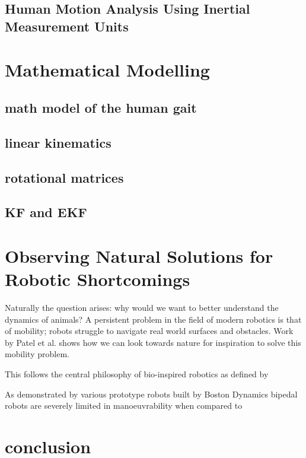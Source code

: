 \subsection{}
\subsection{Human Motion Analysis Using Inertial Measurement Units}


\section{Mathematical Modelling}
\subsection{math model of the human gait}
\subsection{linear kinematics}
\subsection{rotational matrices}
\subsection{KF and EKF}


\section{Observing Natural Solutions for Robotic Shortcomings}
Naturally the question arises:  why would we want to better understand the dynamics of animals? A persistent problem in the field of modern robotics is that of mobility; robots struggle to navigate real world surfaces and obstacles. Work by Patel et al. \cite{patel2013rapid} shows how we can look towards nature for inspiration to solve this mobility problem.

This follows the central philosophy of bio-inspired robotics as defined by 

As demonstrated by various prototype robots built by Boston Dynamics bipedal robots are severely limited in manoeuvrability when compared to   


\section{conclusion}






